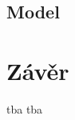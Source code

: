 \documentclass[a4, 11pt]{article}
\theoremstyle{definition}
\theoremstyle{remark}
\begin{document}
	\subsection{Model}
	
	\newpage
	\section{Závěr}\label{sec:zaver}
	tba tba
\end{document}
